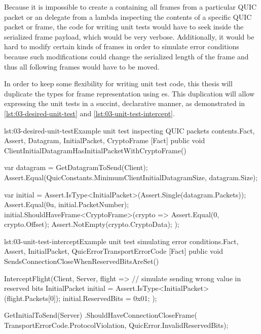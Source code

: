 Because it is impossible to create a  containing all frames from a particular QUIC
packet or an  delegate from a lambda inspecting the contents of a specific QUIC
packet or frame, the code for writing unit tests would have to seek inside the serialized frame
payload, which would be very verbose. Additionally, it would be hard to modify certain kinds of
frames in order to simulate error conditions because such modifications could change the serialized
length of the frame and thus all following frames would have to be moved.

In order to keep some flexibility for writing unit test code, this thesis will duplicate the types
for frame representation using es. This duplication will allow expressing the unit
tests in a succint, declarative manner, as demonstrated in \autoref{lst:03-desired-unit-test} and
\autoref{lst:03-unit-test-intercept}.

\begin{myListing}{lst:03-desired-unit-test}{Example unit test inspecting QUIC packets contents.}{Fact, Assert, Datagram, InitialPacket, CryptoFrame}{}
    [Fact]
    public void ClientInitialDatagramHasInitialPacketWithCryptoFrame()
    {
        var datagram = GetDatagramToSend(Client);
        Assert.Equal(QuicConstants.MinimumClientInitialDatagramSize, datagram.Size);

        var initial = Assert.IsType<InitialPacket>(Assert.Single(datagram.Packets));
        Assert.Equal(0u, initial.PacketNumber);
        initial.ShouldHaveFrame<CryptoFrame>(crypto =>
        {
            Assert.Equal(0, crypto.Offset);
            Assert.NotEmpty(crypto.CryptoData);
        });
    }
\end{myListing}

\begin{myListing}{lst:03-unit-test-intercept}{Example unit test simulating error conditions.}{Fact, Assert, InitialPacket, QuicError}{TransportErrorCode}
    [Fact]
    public void SendsConnectionCloseWhenReservedBitsAreSet()
    {
        InterceptFlight(Client, Server, flight =>
        {
            // simulate sending wrong value in reserved bits
            InitialPacket initial = Assert.IsType<InitialPacket>(flight.Packets[0]);
            initial.ReservedBits = 0x01;
        });

        GetInitialToSend(Server)
            .ShouldHaveConnectionCloseFrame(
                TransportErrorCode.ProtocolViolation,
                QuicError.InvalidReservedBits);
    }
\end{myListing}

